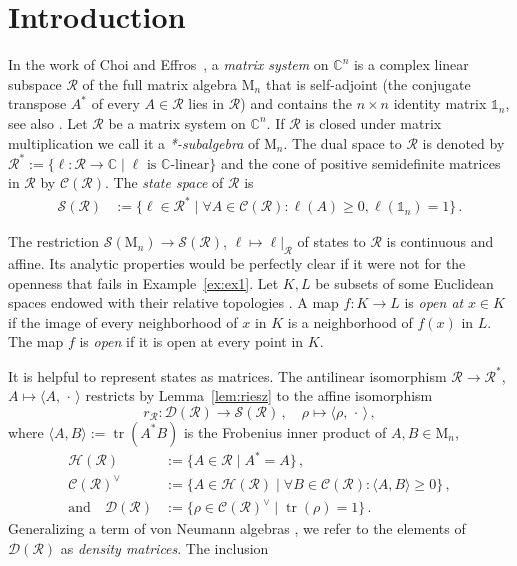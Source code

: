 \documentclass[a4paper,11pt,reqno]{amsart}
\newcommand{\C}{\mathbb{C}}
\newcommand{\M}{\mathrm{M}}
\newcommand{\cC}{\mathcal{C}}
\newcommand{\cD}{\mathcal{D}}
\newcommand{\cH}{\mathcal{H}}
\newcommand{\cR}{\mathcal{R}}
\newcommand{\cS}{\mathcal{S}}
\newcommand{\id}{\mathds{1}}
\DeclareMathOperator\tr{tr}
\theoremstyle{definition}
\theoremstyle{remark}
\numberwithin{equation}{section}
\begin{document}
\section{Introduction}
\label{sec:intro}
%
In the work of Choi and Effros~\cite{ChoiEffros1977}, a \emph{matrix system} 
on $\C^n$ is a complex linear subspace $\cR$ of the full matrix algebra $\M_n$ 
that is self-adjoint (the conjugate transpose $A^\ast$ of every $A\in\cR$ lies 
in $\cR$) and contains the $n\times n$ identity matrix $\id_n$, see also 
\cite{Arveson2010,Paulsen2002}. Let $\cR$ be a matrix system on $\C^n$. If 
$\cR$ is closed under matrix multiplication we call it a 
\emph{*-subalgebra} of $\M_n$. The dual space to $\cR$ is denoted by 
$\cR^\ast:=\{\ell:\cR\to\C\mid \text{$\ell$ is $\C$-linear}\}$ and the cone 
of positive semidefinite matrices in $\cR$ by $\cC(\cR)$. The 
\emph{state space} of $\cR$ is
\begin{align*}
\cS(\cR) & := 
\{\ell\in\cR^\ast \mid \forall A\in\cC(\cR):\ell(A)\geq 0, \ell(\id_n)=1 \}\,.
\end{align*}
\par
%
The restriction $\cS(\M_n)\to\cS(\cR)$, $\ell\mapsto\ell|_{\cR}$ of states to 
$\cR$ is continuous and affine. Its analytic properties would be perfectly 
clear if it were not for the openness that fails in Example~\ref{ex:ex1}. Let 
$K,L$ be subsets of some Euclidean spaces endowed with their relative topologies 
\cite{Kelley1975}. A map $f:K\to L$ is \emph{open at} $x\in K$ if the image 
of every neighborhood of $x$ in $K$ is a neighborhood of $f(x)$ in $L$. The 
map $f$ is \emph{open} if it is open at every point in $K$. 
\par
%
It is helpful to represent states as matrices. The antilinear isomorphism 
$\cR\to\cR^\ast$, $A\mapsto\langle A,\,\cdot\,\rangle$ restricts by 
Lemma~\ref{lem:riesz} to the affine isomorphism
\[\textstyle
r_\cR:\cD(\cR)\to\cS(\cR)\,,
\quad 
\rho\mapsto\langle \rho,\,\cdot\,\rangle\,,
\]
where $\langle A,B\rangle:=\tr(A^\ast B)$ is the Frobenius inner 
product of $A,B\in\M_n$,
\begin{align*}
\cH(\cR) 
& :=\{A\in\cR\mid A^\ast=A\}\,,\\ 
\cC(\cR)^\vee 
& := \{A\in\cH(\cR) \mid \forall B\in\cC(\cR):\langle A,B\rangle\geq 0\}\,,\\
\text{and}\quad
\cD(\cR) 
& := \{\rho\in\cC(\cR)^\vee \mid \tr(\rho)=1 \}\,.
\end{align*}
Generalizing a term of von Neumann algebras \cite{BratteliRobinson1987},
we refer to the elements of $\cD(\cR)$ as \emph{density matrices}. The inclusion 
\end{document}
